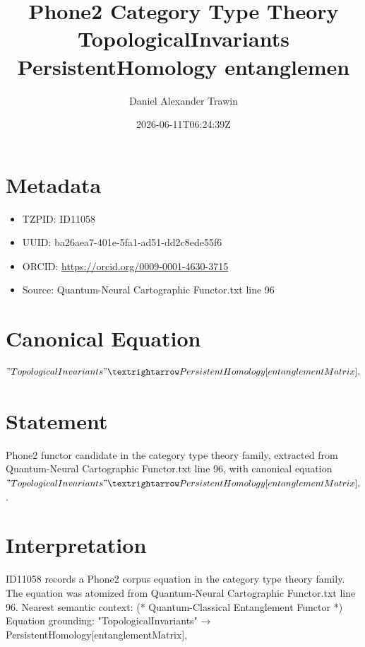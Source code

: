 \documentclass[11pt]{article}
\title{Phone2 Category Type Theory TopologicalInvariants PersistentHomology entanglemen}
\author{Daniel Alexander Trawin}
\date{2026-06-11T06:24:39Z}
\begin{document}
\maketitle
\section*{Metadata}
\begin{itemize}
\item TZPID: ID11058
\item UUID: ba26aea7-401e-5fa1-ad51-dd2c8ede55f6
\item ORCID: \url{https://orcid.org/0009-0001-4630-3715}
\item Source: Quantum-Neural Cartographic Functor.txt line 96
\end{itemize}
\section*{Canonical Equation}
\[
"TopologicalInvariants" → PersistentHomology[entanglementMatrix],
\]
\section*{Statement}
Phone2 functor candidate in the category type theory family, extracted from Quantum-Neural Cartographic Functor.txt line 96, with canonical equation $"TopologicalInvariants" → PersistentHomology[entanglementMatrix],$.
\section*{Interpretation}
ID11058 records a Phone2 corpus equation in the category type theory family. The equation was atomized from Quantum-Neural Cartographic Functor.txt line 96. Nearest semantic context: (* Quantum-Classical Entanglement Functor *) Equation grounding: "TopologicalInvariants" → PersistentHomology[entanglementMatrix],
\end{document}

